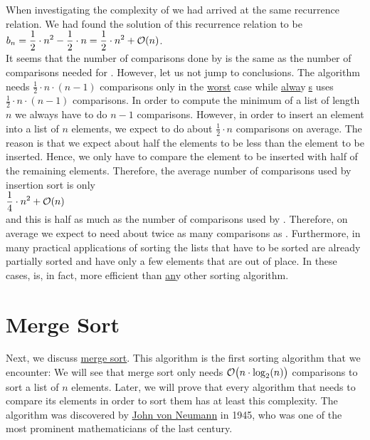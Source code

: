 When investigating the complexity of  we had arrived at the same recurrence
relation. We had found the solution of this recurrence relation to be
\\[0.2cm]
\hspace*{1.3cm} $\displaystyle b_n = \frac{1}{2} \cdot n^2 - \frac{1}{2}\cdot n = \frac{1}{2} \cdot n^2 +
\mathcal{O}(n)$. 
\\[0.2cm]
It seems that the number of comparisons done by  is the same as the number of
comparisons needed for .  However, let us not jump to conclusions.
The algorithm  needs
$\frac{1}{2}\cdot n \cdot (n-1)$ comparisons only in the \underline{worst} case while 
\underline{alwa}y$\!\!$\underline{$\;$s} uses $\frac{1}{2} \cdot n\cdot(n-1)$ comparisons.
In order to compute the minimum of a list of length $n$ we always have to do $n-1$ comparisons.
However, in order to insert an element into a list of $n$ elements, we expect to do about
$\frac{1}{2} \cdot n$ comparisons on average.  The reason is that we expect about half the elements  to
be less than the element to be inserted.  Hence, we only have to compare the element to be inserted
with half of the remaining elements.  Therefore, the average number of comparisons used by
insertion sort is only
\\[0.2cm]
\hspace*{1.3cm}
 $\displaystyle \frac{1}{4} \cdot n^2 + \mathcal{O}(n)$
\\[0.2cm]
and this is half as much as the number of comparisons used by .  Therefore, on
average we expect  to need about twice as many comparisons as .
Furthermore,  in many practical applications of sorting the lists that have to be sorted are already
partially sorted and have only a few elements that are out of place.  In these cases,
 is, in fact,  more efficient than \underline{an}y other sorting algorithm.


\section{Merge Sort}
Next, we discuss \href{https://en.wikipedia.org/wiki/Merge_sort}{merge sort}.  This algorithm
is the first  sorting algorithm that we encounter: We will see that merge sort 
only needs $\mathcal{O}\bigl(n \cdot \log_2(n)\bigr)$ comparisons to sort a list of $n$ elements.  Later, we will prove
that every algorithm that needs to compare its elements in order to sort them has at least this complexity.  
The  algorithm was discovered by
\href{http://en.wikipedia.org/wiki/John_von_Neumann}{John von Neumann} in 1945, who 
was one of the most prominent mathematicians of the last century.  

